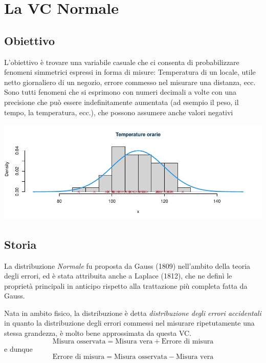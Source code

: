 \documentclass[
  11pt,
]{book}
\theoremstyle{mytheoremstyle}
\theoremstyle{mydefstyle}
\begin{document}
\section{La VC Normale}\label{la-vc-normale}

\subsection{Obiettivo}\label{obiettivo-1}

L'obiettivo è trovare una variabile casuale che ci consenta di probabilizzare fenomeni simmetrici espressi in forma di misure:
Temperatura di un locale, utile netto giornaliero di un negozio, errore commesso nel misurare una distanza, ecc.
Sono tutti fenomeni che si esprimono con numeri decimali a volte con una precisione che può essere indefinitamente aumentata (ad esempio il peso, il tempo, la temperatura, ecc.), che possono assumere anche valori negativi

\begin{center}\includegraphics{Appunti_di_Statistica_2025_files/figure-latex/07c-Normale-1-1} \end{center}

\subsection{Storia}\label{storia-1}

La distribuzione \emph{Normale} fu proposta da Gauss (1809) nell'ambito della teoria degli errori, ed
è stata attribuita anche a Laplace (1812), che ne definì le proprietà principali in anticipo rispetto alla trattazione più completa fatta da Gauss.

Nata in ambito fisico, la distribuzione è detta \emph{distribuzione degli errori accidentali} in quanto la distribuzione degli errori commessi nel misurare ripetutamente una stessa grandezza, è molto bene approssimata da questa VC.
\[\text{Misura osservata}=\text{Misura vera}+\text{Errore di misura}\]
e dunque
\[\text{Errore di misura}=\text{Misura osservata}-\text{Misura vera}\]
\end{document}

